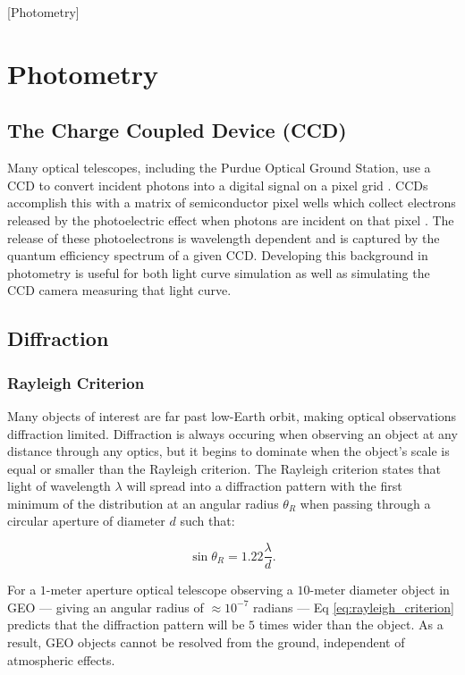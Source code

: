 [Photometry]
\graphicspath{{/Users/liamrobinson/Documents/PyLightCurves/docs/build/html/_images}}

\section{Photometry}

\subsection{The Charge Coupled Device (CCD)}

Many optical telescopes, including the Purdue Optical Ground Station, use a CCD to convert incident photons into a digital signal on a pixel grid \cite{krag2003}. CCDs accomplish this with a matrix of semiconductor pixel wells which collect electrons released by the photoelectric effect when photons are incident on that pixel \cite{krag2003}. The release of these photoelectrons is wavelength dependent and is captured by the quantum efficiency spectrum of a given CCD. Developing this background in photometry is useful for both light curve simulation as well as simulating the CCD camera measuring that light curve. 

\subsection{Diffraction}

\subsubsection{Rayleigh Criterion}

Many objects of interest are far past low-Earth orbit, making optical observations diffraction limited. Diffraction is always occuring when observing an object at any distance through any optics, but it begins to dominate when the object's scale is equal or smaller than the Rayleigh criterion. The Rayleigh criterion states that light of wavelength $\lambda$ will spread into a diffraction pattern with the first minimum of the distribution at an angular radius $\theta_R$ when passing through a circular aperture of diameter $d$ such that:

\begin{equation} \label{eq:rayleigh_criterion}
  \sin\theta_R = 1.22 \frac{\lambda}{d}.
\end{equation}

For a $1$-meter aperture optical telescope observing a $10$-meter diameter object in GEO --- giving an angular radius of $\approx 10^{-7}$ radians --- Eq \ref{eq:rayleigh_criterion} predicts that the diffraction pattern will be $5$ times wider than the object. As a result, GEO objects cannot be resolved from the ground, independent of atmospheric effects. 

